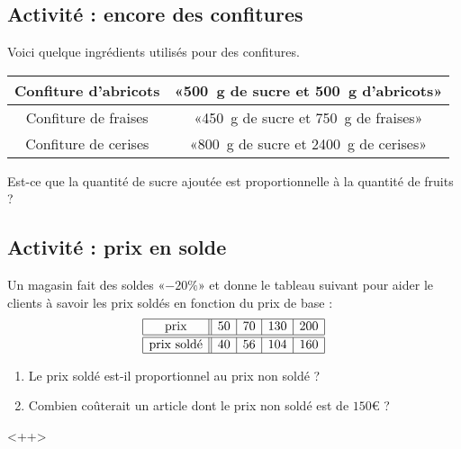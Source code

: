 
\subsection*{Activité : encore des confitures}

Voici quelque ingrédients utilisés pour des confitures.
\begin{center}
    \begin{tabular}[]{|c|c|}
        \hline
        Confiture d'abricots& «\SI{500}{\gram} de sucre et \SI{500}{\gram} d'abricots» \\
        \hline
        Confiture de fraises&«\SI{450}{\gram} de sucre et \SI{750}{\gram} de fraises» \\
        \hline
        Confiture de cerises&  «\SI{800}{\gram} de sucre et \SI{2400}{\gram} de cerises» \\ 
        \hline
    \end{tabular}
\end{center}
Est-ce que la quantité de sucre ajoutée est proportionnelle à la quantité de fruits ?

\subsection*{Activité : prix en solde}

Un magasin fait des soldes «\( -20\%\)» et donne le tableau suivant pour aider le clients à savoir les prix soldés en fonction du prix de base :
\begin{equation*}
    \begin{array}[]{|c||c|c|c|c|}
        \hline
        \text{prix}&50&70&130&200\\
        \hline\hline
        \text{prix soldé}&40&56&104&160\\
        \hline
    \end{array}
\end{equation*}
\begin{enumerate}
    \item
        Le prix soldé est-il proportionnel au prix non soldé ?
    \item
        Combien coûterait un article dont le prix non soldé est de \( 150\)€ ?
\end{enumerate}
<++>
